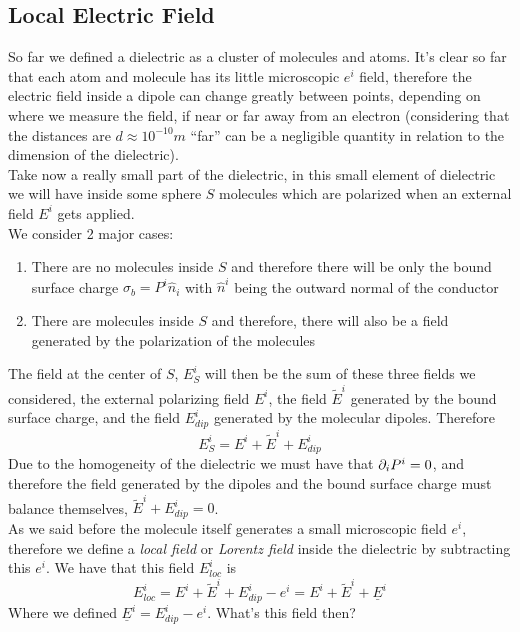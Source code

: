 \documentclass[../electromagnetism]{subfiles}
\begin{document}
\subsection{Local Electric Field}
So far we defined a dielectric as a cluster of molecules and atoms. It's clear so far that each atom and molecule has its little microscopic $e^i$ field, therefore the electric field inside a dipole can change greatly between points, depending on where we measure the field, if near or far away from an electron (considering that the distances are $d\approx10^{-10}\unit{m}$ ``far'' can be a negligible quantity in relation to the dimension of the dielectric).\\
Take now a really small part of the dielectric, in this small element of dielectric we will have inside some sphere $S$ molecules which are polarized when an external field $E^i$ gets applied.\\
We consider 2 major cases:
\begin{enumerate}
\item There are no molecules inside $S$ and therefore there will be only the bound surface charge $\sigma_b=P^i\hat{n}_i$ with $\hat{n}^i$ being the outward normal of the conductor
\item There are molecules inside $S$ and therefore, there will also be a field generated by the polarization of the molecules
\end{enumerate}
The field at the center of $S$, $E^i_{S}$ will then be the sum of these three fields we considered, the external polarizing field $E^i$, the field $\tilde{E}^i$ generated by the bound surface charge, and the field $E_{dip}^i$ generated by the molecular dipoles. Therefore
\begin{equation}
	E^i_S=E^i+\tilde{E}^i+E_{dip}^i
	\label{eq:fieldinsideS}
\end{equation}
Due to the homogeneity of the dielectric we must have that $\partial_iP^i=0$, and therefore the field generated by the dipoles and the bound surface charge must balance themselves, $\tilde{E}^i+E^i_{dip}=0$.\\
As we said before the molecule itself generates a small microscopic field $e^i$, therefore we define a \textit{local field} or \textit{Lorentz field} inside the dielectric by subtracting this $e^i$. We have that this field $E^i_{loc}$ is
\begin{equation}
	E^i_{loc}=E^i+\tilde{E}^i+E^i_{dip}-e^i=E^i+\tilde{E}^i+\underline{E}^i
	\label{eq:localfielddie}
\end{equation}
Where we defined $\underline{E}^i=E^i_{dip}-e^i$. What's this field then?\\
\end{document}
